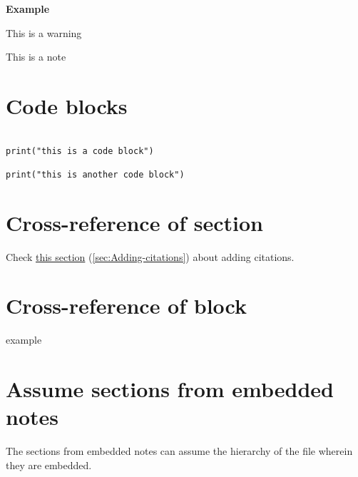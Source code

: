 \documentclass{extarticle}
\begin{document}
\textbf{Example}

\begin{tcolorbox}[width=1.0\textwidth,colback={red},title={warning},outer arc=0mm,colupper=white]

This is a warning

\end{tcolorbox}



\begin{tcolorbox}[width=1.0\textwidth,colback={white},title={note},outer arc=0mm,colupper=black]

This is a note

\end{tcolorbox}





\section{Code blocks}

\begin{verbatim}

print("this is a code block")

print("this is another code block")

\end{verbatim}



\section{Cross-reference of section}

Check \hyperref[sec:Adding-citations]{this section} (\autoref{sec:Adding-citations}) about adding citations.





\section{\maltese Cross-reference of block}

example



\section{Assume sections from embedded notes}

The sections from embedded notes can assume the hierarchy of the file wherein they are embedded.
\end{document}
